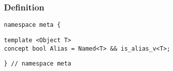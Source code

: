 
\subsubsection{Definition}

\begin{verbatim}
namespace meta {
\end{verbatim}
\begin{verbatim}
template <Object T>
concept bool Alias = Named<T> && is_alias_v<T>;

\end{verbatim}
\begin{verbatim}
} // namespace meta
\end{verbatim}
